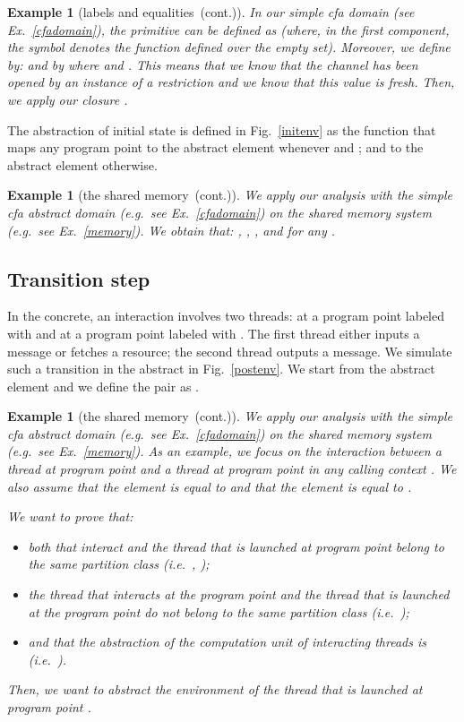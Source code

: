 \documentclass{article}
\newcommand{\boxexample}{}
\newtheorem{example}[thm]{Example}
\newcommand{\pp}[1]{}
\newcommand{\memlabe}{5}
\newcommand{\memlabf}{6}
\newcommand{\memlabg}{7}
\newcommand{\memlabj}{10}
\newcommand{\continued}{(cont.)}
\newcommand{\cfadomain}{labels and equalities}
\newcommand{\ccfadomain}{\cfadomain\ \continued}
\newcommand{\shareanalysis}{the shared memory}
\newcommand{\cflowanalysis}{\shareanalysis\ \continued}
\begin{document}
\begin{example}[\ccfadomain]
In our simple \emph{cfa} domain (see Ex.~\ref{cfadomain}), 
the primitive  can be defined as  (where, in the first component, the symbol  denotes the function defined over the empty set). Moreover, we define  by: 
  and by  where  and . This means that we know that the channel has been opened by an instance of a restriction  and we know that this value is fresh. Then, we apply our closure .
\boxexample\end{example}

The abstraction  of initial state is defined in Fig.~\ref{initenv} as the function that maps any program point  to the abstract element  whenever 
 and ; 
and to the abstract element  otherwise.

\begin{example}[\cflowanalysis]
We apply our analysis with the simple \emph{cfa} abstract domain (e.g.~see Ex.~\ref{cfadomain}) on the shared memory system (e.g.~see Ex.~\ref{memory}).
We obtain that: , , , and  
for any .
\boxexample\end{example}

\subsection{Transition step}
In the concrete, an interaction involves two threads:  at a program point labeled with    and  at a program point labeled with . 
The first thread either inputs a message or fetches a resource; 
the second thread outputs a message.
We simulate such a transition  in the abstract in Fig.~\ref{postenv}. 
We start from the abstract element  and we define the pair  as .

\begin{example}[\cflowanalysis]
We apply our analysis with the simple \emph{cfa} abstract domain (e.g.~see Ex.~\ref{cfadomain}) on the shared memory system (e.g.~see Ex.~\ref{memory}).
As an example, we focus on the interaction between a thread at program point \pp{\memlabe} and a thread at  program point \pp{\memlabj} in any calling context .
We also assume that the element 
 is equal to  and 
that the  element  is equal to .


We want to prove that:
\begin{itemize}
\item  both that interact and the thread that is launched at program point \pp{\memlabf} belong to the same partition class (i.e.~, );
\item the thread that interacts at the program point \pp{\memlabe} and the thread that is launched at the program point \pp{\memlabg} do not belong to the same partition class (i.e.~);
\item  and that the abstraction of the computation unit of interacting threads is  (i.e.~). 
\end{itemize}
Then, we want to abstract the environment of the thread that is launched at program point \pp{\memlabf}.
\boxexample\end{example}
\end{document}
